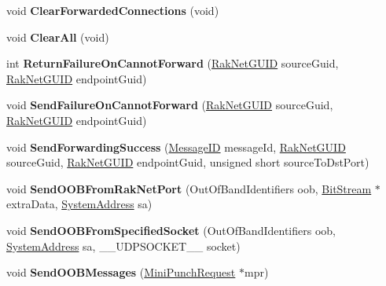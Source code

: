 \begin{DoxyCompactItemize}
\item 
\hypertarget{class_rak_net_1_1_router2_a02b21891222c5e365051a1a40500d236}{void {\bfseries Clear\-Forwarded\-Connections} (void)}\label{class_rak_net_1_1_router2_a02b21891222c5e365051a1a40500d236}

\item 
\hypertarget{class_rak_net_1_1_router2_ace8965777e62fbd115b2aa7e458e6424}{void {\bfseries Clear\-All} (void)}\label{class_rak_net_1_1_router2_ace8965777e62fbd115b2aa7e458e6424}

\item 
\hypertarget{class_rak_net_1_1_router2_ae021a22d4843a347f01dfd7343fa372c}{int {\bfseries Return\-Failure\-On\-Cannot\-Forward} (\hyperlink{struct_rak_net_1_1_rak_net_g_u_i_d}{Rak\-Net\-G\-U\-I\-D} source\-Guid, \hyperlink{struct_rak_net_1_1_rak_net_g_u_i_d}{Rak\-Net\-G\-U\-I\-D} endpoint\-Guid)}\label{class_rak_net_1_1_router2_ae021a22d4843a347f01dfd7343fa372c}

\item 
\hypertarget{class_rak_net_1_1_router2_a3d5d6fbf4208bd3d7370d8ad9dd215fd}{void {\bfseries Send\-Failure\-On\-Cannot\-Forward} (\hyperlink{struct_rak_net_1_1_rak_net_g_u_i_d}{Rak\-Net\-G\-U\-I\-D} source\-Guid, \hyperlink{struct_rak_net_1_1_rak_net_g_u_i_d}{Rak\-Net\-G\-U\-I\-D} endpoint\-Guid)}\label{class_rak_net_1_1_router2_a3d5d6fbf4208bd3d7370d8ad9dd215fd}

\item 
\hypertarget{class_rak_net_1_1_router2_a2941eb16a50e5d478d176e8e75a849dc}{void {\bfseries Send\-Forwarding\-Success} (\hyperlink{namespace_rak_net_a1b2f3bf4bad2bb6a8360a12295fbed0c}{Message\-I\-D} message\-Id, \hyperlink{struct_rak_net_1_1_rak_net_g_u_i_d}{Rak\-Net\-G\-U\-I\-D} source\-Guid, \hyperlink{struct_rak_net_1_1_rak_net_g_u_i_d}{Rak\-Net\-G\-U\-I\-D} endpoint\-Guid, unsigned short source\-To\-Dst\-Port)}\label{class_rak_net_1_1_router2_a2941eb16a50e5d478d176e8e75a849dc}

\item 
\hypertarget{class_rak_net_1_1_router2_aa7d758c774f49a74d8b1a7d04e7ace6e}{void {\bfseries Send\-O\-O\-B\-From\-Rak\-Net\-Port} (Out\-Of\-Band\-Identifiers oob, \hyperlink{class_rak_net_1_1_bit_stream}{Bit\-Stream} $\ast$extra\-Data, \hyperlink{struct_rak_net_1_1_system_address}{System\-Address} sa)}\label{class_rak_net_1_1_router2_aa7d758c774f49a74d8b1a7d04e7ace6e}

\item 
\hypertarget{class_rak_net_1_1_router2_a40c6733df588acf0a2fac5cc84056714}{void {\bfseries Send\-O\-O\-B\-From\-Specified\-Socket} (Out\-Of\-Band\-Identifiers oob, \hyperlink{struct_rak_net_1_1_system_address}{System\-Address} sa, \-\_\-\-\_\-\-U\-D\-P\-S\-O\-C\-K\-E\-T\-\_\-\-\_\- socket)}\label{class_rak_net_1_1_router2_a40c6733df588acf0a2fac5cc84056714}

\item 
\hypertarget{class_rak_net_1_1_router2_a0c51d38c4953799abe7cbb1e4a481eca}{void {\bfseries Send\-O\-O\-B\-Messages} (\hyperlink{struct_rak_net_1_1_router2_1_1_mini_punch_request}{Mini\-Punch\-Request} $\ast$mpr)}\label{class_rak_net_1_1_router2_a0c51d38c4953799abe7cbb1e4a481eca}

\end{DoxyCompactItemize}
